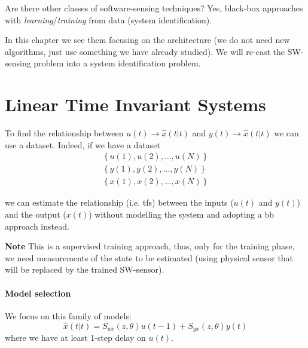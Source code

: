 Are there other classes of software-sensing techniques? Yes, black-box approaches with \emph{learning}/\emph{training} from data (system identification).
 
In this chapter we see them focusing on the architecture (we do not need new algorithms, just use something we have already studied). We will re-cast the SW-sensing problem into a system identification problem. 

\section{Linear Time Invariant Systems}\label{sec:BB-SW-LTI}

To find the relationship between $u(t) \rightarrow \hat{x}(t|t)$ and $y(t) \rightarrow \hat{x}(t|t)$ we can use a dataset.
Indeed, if we have a dataset
\begin{align*}
    \left\{ u(1), u(2), \ldots, u(N) \right\} \\
    \left\{ y(1), y(2), \ldots, y(N) \right\} \\
    \left\{ x(1), x(2), \ldots, x(N) \right\}
\end{align*}

we can estimate the relationship (i.e. \gls{tf}s) between the inputs ($u(t)$ and $y(t)$) and the output ($x(t)$) without modelling the system and adopting a \gls{bb} approach instead.

\textbf{Note} This is a supervised training approach, thus, only for the training phase, we need measurements of the state to be estimated (using physical sensor that will be replaced by the trained SW-sensor).


\paragraph{Model selection} We focus on this family of models:
\[
	\hat{x}(t|t) = S_{ux}(z, \theta) u(t-1) + S_{yx}(z,\theta)y(t)
\]
where we have at least 1-step delay on $u(t)$.
\begin{figure}[H]
    \centering
\end{figure}

